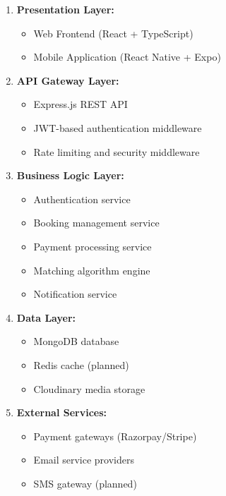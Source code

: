 \documentclass[12pt,a4paper]{article}
\begin{document}
\begin{enumerate}[leftmargin=*]
    \item \textbf{Presentation Layer:}
    \begin{itemize}
        \item Web Frontend (React + TypeScript)
        \item Mobile Application (React Native + Expo)
    \end{itemize}
    
    \item \textbf{API Gateway Layer:}
    \begin{itemize}
        \item Express.js REST API
        \item JWT-based authentication middleware
        \item Rate limiting and security middleware
    \end{itemize}
    
    \item \textbf{Business Logic Layer:}
    \begin{itemize}
        \item Authentication service
        \item Booking management service
        \item Payment processing service
        \item Matching algorithm engine
        \item Notification service
    \end{itemize}
    
    \item \textbf{Data Layer:}
    \begin{itemize}
        \item MongoDB database
        \item Redis cache (planned)
        \item Cloudinary media storage
    \end{itemize}
    
    \item \textbf{External Services:}
    \begin{itemize}
        \item Payment gateways (Razorpay/Stripe)
        \item Email service providers
        \item SMS gateway (planned)
    \end{itemize}
\end{enumerate}
\end{document}
